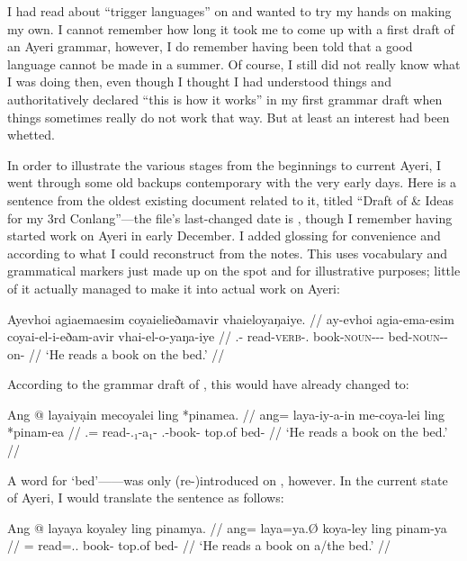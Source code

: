 I had read about ``trigger languages'' on  and wanted to
try my hands on making my own. I cannot remember how long it took me to come up
with a first draft of an Ayeri grammar, however, I do remember having been told
that a good language cannot be made in a summer. Of course, I still did not
really know what I was doing then, even though I thought I had understood
things and authoritatively declared ``this is how it works'' in my first
grammar draft when things sometimes really do not work that way. But at least
an interest had been whetted.

In order to illustrate the various stages from the beginnings to current Ayeri,
I went through some old backups contemporary with the very early days. 
Here is a sentence from the oldest existing document related to it, titled 
``Draft of \& Ideas for my 3rd Conlang''---the file's last-changed date is 
, though I remember having started work on Ayeri in early 
December. I added glossing for convenience and according to what I could 
reconstruct from the notes. This uses vocabulary and grammatical markers just 
made up on the spot and for illustrative purposes; little of it actually 
managed to make it into actual work on Ayeri:

\ex\begingl
	\gla Ayevhoi agiaemaesim coyaielieðamavir vhaieloyaŋaiye. //
	\glb ay-evhoi agia-ema-esim coyai-el-i-eðam-avir vhai-el-o-yaŋa-iye //
	\glc \Tsg{}.\An{}-\Subj{} read-\textsc{verb}-\Subj{}.\An{} 
		book-\textsc{noun}-\An{}-\Indf{}-\Parg{} 
		bed-\textsc{noun}-\Inan{}-on-\Loc{} //
	\glft `He reads a book on the bed.' //
\endgl\xe

According to the grammar draft of , this would have already
changed to:

\ex\begingl
	\gla Ang @ layaiyạin mecoyalei ling *pinamea. //
	\glb ang= laya-iy-a-in me-coya-lei ling *pinam-ea //
	\glc \Aarg{}.\Subj{}= read-\Tsg{}.\An{}₁-a₁-\Subj{} 
		\Indf{}.\Inan{}-book-\PargI{} top.of bed-\Loc{} //
	\glft `He reads a book on the bed.' //
\endgl\xe

A word for `bed'------was only (re-)introduced on
, however. In the current state of Ayeri, I would 
translate the sentence as follows:

\ex\begingl
	\gla Ang @ layaya koyaley ling pinamya. //
	\glb ang= laya=ya.Ø koya-ley ling pinam-ya //
	\glc \AgtT{}= read=\Tsg{}.\M{}.\Top{} book-\PargI{} top.of bed-\Loc{} //
	\glft `He reads a book on a/the bed.' //
\endgl\xe


